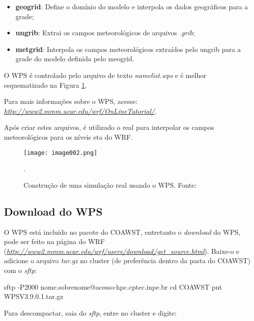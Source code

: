 \begin{itemize}
\item \textbf{geogrid}: Define o domínio do modelo e interpola os dados geográficos para a grade;
\item \textbf{ungrib}: Extrai os campos meteorológicos de arquivos \textit{.grib};
\item \textbf{metgrid}: Interpola os campos meteorológicos extraídos pelo ungrib para a grade do modelo definida pelo meogrid.
\end{itemize}
\bigskip

\noindent O WPS é controlado pelo arquivo de texto \textit{namelist.wps} e é melhor esquematizado na Figura \textcolor{bleu_cite}{\ref{wpsdetalha}}.
\bigskip

\noindent Para mais informações sobre o WPS, acesse:  \textcolor{bleu_cite}{\href{http://www2.mmm.ucar.edu/wrf/OnLineTutorial/}{\textit{http://www2.mmm.ucar.edu/wrf/OnLineTutorial/}}}.
\bigskip

\noindent Após criar estes arquivos, é utilizado o real para interpolar os campos meteorológicos para os níveis eta do WRF.
\bigskip

\begin{figure}[H]
    \centering
    \captionsetup{justification=centering}
    \texttt{[image: image002.png]}
    \caption{Construção de uma simulação real usando o WPS. \newline Fonte: \textcite{duda2006}}.
    \label{wpsdetalha}
\end{figure}
\bigskip

\subsection{Download do WPS}
\bigskip

\noindent O WPS está incluído no pacote do COAWST, entretanto o \textit{download} do WPS, pode ser feito na página do WRF (\textcolor{bleu_cite}{\href{http://www2.mmm.ucar.edu/wrf/users/download/get\_source.html}{\textit{http://www2.mmm.ucar.edu/wrf/users/download/get\_source.html}}}). Baixe-o e adicione o arquivo \textit{tar.gz} no cluster (de preferência dentro da pasta do COAWST) com o \textit{sftp}:
\bigskip

\begin{bashcode}
sftp -P2000 nome.sobrenome@acesso-hpc.cptec.inpe.br
cd COAWST
put WPSV3.9.0.1.tar.gz
\end{bashcode}
\bigskip

\noindent Para descompactar, saia do \textit{sftp}, entre no cluster e digite:
\bigskip

